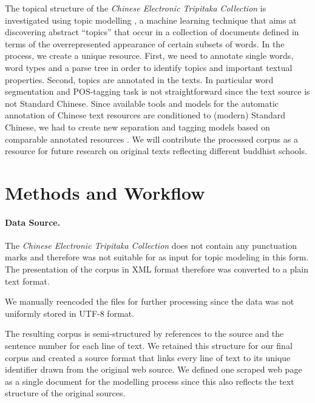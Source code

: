 \documentclass[a4paper,10pt]{article}
\newcommand{\TODO}[1]{\begingroup\color{red}#1\endgroup}
\newcommand{\NR}[1]{\begingroup\color{orange}#1\endgroup}
\begin{document}
The topical structure of the \textit{Chinese Electronic Tripitaka
  Collection}  is investigated using topic
modelling \cite{blei2012probabilistic}, a machine learning technique that
aims at discovering abstract ``topics'' that occur in a collection of
documents defined in terms of the overrepresented appearance of certain
subsets of words. In the process, we create a unique resource. First, we
need to annotate single words, word types and a parse tree in order to
identify topics and important textual properties. Second, topics are
annotated in the texts.  In particular word segmentation and POS-tagging
task is not straightforward since the text source is not Standard
Chinese. Since available tools and models for the automatic annotation of
Chinese text resources are conditioned to (modern) Standard Chinese, we had
to create new separation and tagging models based on comparable annotated
resources .  We will contribute the processed
corpus as a resource for future research on original texts reflecting
different buddhist schools.

\section{Methods and Workflow} 

\paragraph{Data Source.} The \textit{Chinese Electronic Tripitaka
  Collection} \cite{} does not contain any punctuation marks and therefore
was not suitable for as input for topic modeling in this form. The
presentation of the corpus in XML format 
therefore was converted to a plain text format.
  
  We manually reencoded the files for further processing \NR{since the data
  was not uniformly stored in UTF-8 format}.

  The resulting corpus is semi-structured by references to the source and
  the sentence number for each line of text. We retained this structure for
  our final corpus and created a source format that links every line of
  text to its unique identifier drawn from the original web source. We
  defined one scraped web page as a single document for the modelling
  process since this also reflects the text structure of the original
  sources.
    
\end{document}
